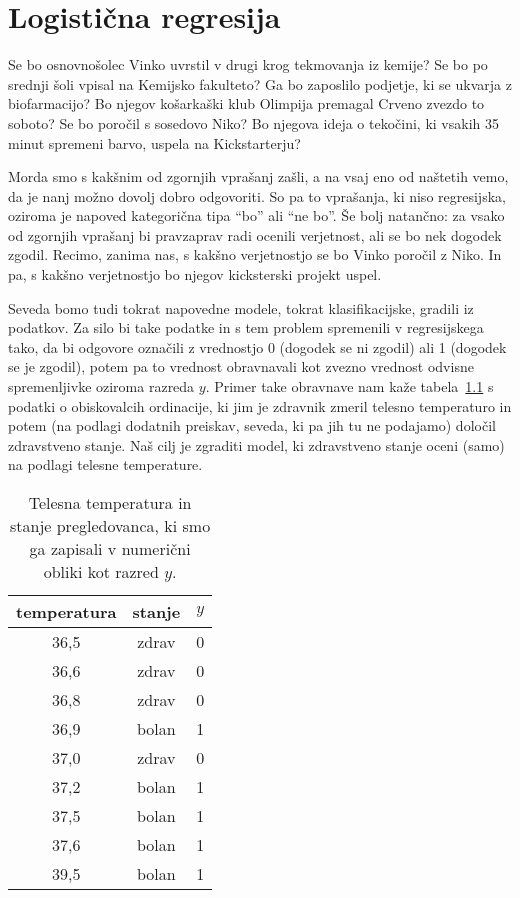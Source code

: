 \chapter{Logistična regresija}

Se bo osnovnošolec Vinko uvrstil v drugi krog tekmovanja iz kemije? Se bo po srednji šoli vpisal na Kemijsko fakulteto? Ga bo zaposlilo podjetje, ki se ukvarja z biofarmacijo? Bo njegov košarkaški klub Olimpija premagal Crveno zvezdo to soboto? Se bo poročil s sosedovo Niko? Bo njegova ideja o tekočini, ki vsakih 35 minut spremeni barvo, uspela na Kickstarterju?

Morda smo s kakšnim od zgornjih vprašanj zašli, a na vsaj eno od naštetih vemo, da je nanj možno dovolj dobro odgovoriti. So pa to vprašanja, ki niso regresijska, oziroma je napoved kategorična tipa ``bo'' ali ``ne bo''. Še bolj natančno: za vsako od zgornjih vprašanj bi pravzaprav radi ocenili verjetnost, ali se bo nek dogodek zgodil. Recimo, zanima nas, s kakšno verjetnostjo se bo Vinko poročil z Niko. In pa, s kakšno verjetnostjo bo njegov kicksterski projekt uspel.

Seveda bomo tudi tokrat napovedne modele, tokrat klasifikacijske, gradili iz podatkov. Za silo bi take podatke in s tem problem spremenili v regresijskega tako, da bi odgovore označili z vrednostjo 0 (dogodek se ni zgodil) ali 1 (dogodek se je zgodil), potem pa to vrednost obravnavali kot zvezno vrednost odvisne spremenljivke oziroma razreda $y$. Primer take obravnave nam kaže tabela~\ref{f:temperatura} s podatki o obiskovalcih ordinacije, ki jim je zdravnik zmeril telesno temperaturo in potem (na podlagi dodatnih preiskav, seveda, ki pa jih tu ne podajamo) določil zdravstveno stanje. Naš cilj je zgraditi model, ki zdravstveno stanje oceni (samo) na podlagi telesne temperature.

\begin{table}[htbp]
\caption{Telesna temperatura in stanje pregledovanca, ki smo ga zapisali v numerični obliki kot razred $y$.}
\label{f:temperatura}
\begin{center}
\begin{tabular}{ccc}
\toprule
temperatura & stanje & $y$ \\
\midrule
36,5 & zdrav & 0 \\
36,6 & zdrav & 0 \\
36,8 & zdrav & 0 \\
36,9 & bolan & 1 \\
37,0 & zdrav & 0 \\
37,2 & bolan & 1 \\
37,5 & bolan & 1 \\
37,6 & bolan & 1 \\
39,5 & bolan & 1 \\
\bottomrule
\end{tabular}
\end{center}
\end{table}

